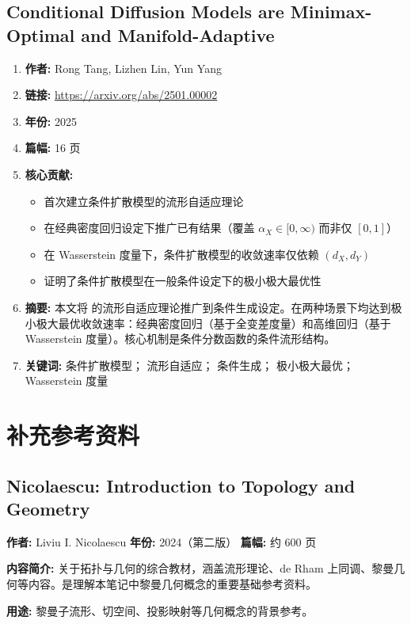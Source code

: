 \subsection{Conditional Diffusion Models are Minimax-Optimal and Manifold-Adaptive}
\begin{enumerate}
    \item \textbf{作者:} Rong Tang, Lizhen Lin, Yun Yang
    \item \textbf{链接:} \url{https://arxiv.org/abs/2501.00002}
    \item \textbf{年份:} 2025
    \item \textbf{篇幅:} 16 页
    \item \textbf{核心贡献:}
        \begin{itemize}
            \item 首次建立条件扩散模型的流形自适应理论
            \item 在经典密度回归设定下推广已有结果（覆盖 $\alpha_X\in[0,\infty)$ 而非仅 $[0,1]$）
            \item 在 Wasserstein 度量下，条件扩散模型的收敛速率仅依赖 $(d_X, d_Y)$
            \item 证明了条件扩散模型在一般条件设定下的极小极大最优性
        \end{itemize}
    \item \textbf{摘要:} 本文将 \citep{tang2024diffusion} 的流形自适应理论推广到条件生成设定。在两种场景下均达到极小极大最优收敛速率：经典密度回归（基于全变差度量）和高维回归（基于 Wasserstein 度量）。核心机制是条件分数函数的条件流形结构。
    \item \textbf{关键词:} 条件扩散模型； 流形自适应； 条件生成； 极小极大最优； Wasserstein 度量
\end{enumerate}

\section{补充参考资料}

\subsection{Nicolaescu: Introduction to Topology and Geometry}
\textbf{作者:} Liviu I. Nicolaescu
\textbf{年份:} 2024（第二版）
\textbf{篇幅:} 约 600 页

\textbf{内容简介:} 关于拓扑与几何的综合教材，涵盖流形理论、de Rham 上同调、黎曼几何等内容。是理解本笔记中黎曼几何概念的重要基础参考资料。

\textbf{用途:} 黎曼子流形、切空间、投影映射等几何概念的背景参考。

